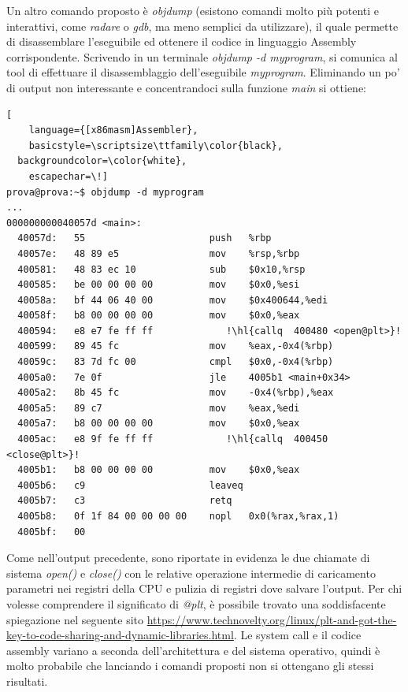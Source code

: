 Un altro comando proposto è \emph{objdump} (esistono comandi molto più potenti e interattivi, come \emph{radare} o \emph{gdb}, ma meno semplici da utilizzare), il quale permette di disassemblare l'eseguibile ed ottenere il codice in linguaggio Assembly corrispondente.
Scrivendo in un terminale \emph{objdump -d myprogram}, si comunica al tool di effettuare il disassemblaggio dell'eseguibile \emph{myprogram}. Eliminando un po' di output non interessante e concentrandoci sulla funzione \emph{main} si ottiene:

\begin{lstlisting}[
	language={[x86masm]Assembler},
	basicstyle=\scriptsize\ttfamily\color{black},
  backgroundcolor=\color{white},
	escapechar=\!]
prova@prova:~$ objdump -d myprogram
...
000000000040057d <main>:
  40057d:	55                   	push   %rbp
  40057e:	48 89 e5             	mov    %rsp,%rbp
  400581:	48 83 ec 10          	sub    $0x10,%rsp
  400585:	be 00 00 00 00       	mov    $0x0,%esi
  40058a:	bf 44 06 40 00       	mov    $0x400644,%edi
  40058f:	b8 00 00 00 00       	mov    $0x0,%eax
  400594:	e8 e7 fe ff ff       	   !\hl{callq  400480 <open@plt>}!
  400599:	89 45 fc             	mov    %eax,-0x4(%rbp)
  40059c:	83 7d fc 00          	cmpl   $0x0,-0x4(%rbp)
  4005a0:	7e 0f                	jle    4005b1 <main+0x34>
  4005a2:	8b 45 fc             	mov    -0x4(%rbp),%eax
  4005a5:	89 c7                	mov    %eax,%edi
  4005a7:	b8 00 00 00 00       	mov    $0x0,%eax
  4005ac:	e8 9f fe ff ff       	   !\hl{callq  400450 <close@plt>}!
  4005b1:	b8 00 00 00 00       	mov    $0x0,%eax
  4005b6:	c9                   	leaveq 
  4005b7:	c3                   	retq   
  4005b8:	0f 1f 84 00 00 00 00 	nopl   0x0(%rax,%rax,1)
  4005bf:	00 
\end{lstlisting}

Come nell'output precedente, sono riportate in evidenza le due chiamate di sistema \emph{open()} e \emph{close()} con le relative operazione intermedie di caricamento parametri nei registri della CPU e pulizia di registri dove salvare l'output. Per chi volesse comprendere il significato di \emph{@plt}, è possibile trovato una soddisfacente spiegazione nel seguente sito \url{https://www.technovelty.org/linux/plt-and-got-the-key-to-code-sharing-and-dynamic-libraries.html}.
Le system call e il codice assembly variano a seconda dell'architettura e del sistema operativo, quindi è molto probabile che lanciando i comandi proposti non si ottengano gli stessi risultati.
